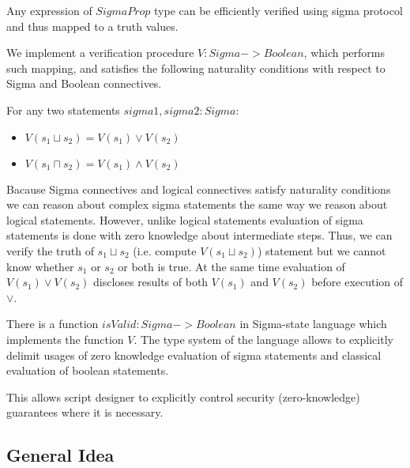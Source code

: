 \documentclass[11pt]{article}
\begin{document}
Any expression of $SigmaProp$ type can be efficiently verified using sigma protocol and thus mapped to a truth values.

We implement a verification procedure $V: Sigma -> Boolean$, which performs such mapping, and satisfies the following
naturality conditions with respect to Sigma and Boolean connectives.

For any two statements $sigma1, sigma2: Sigma$:
\begin{itemize}
    \item $V(s_1 \sqcup s_2) = V(s_1) \lor V(s_2)$
    \item $V(s_1 \sqcap s_2) = V(s_1) \land V(s_2)$
\end{itemize}

Bacause Sigma connectives and logical connectives satisfy naturality conditions we can reason about complex sigma statements
the same way we reason about logical statements.
However, unlike logical statements evaluation of sigma statements is done with zero knowledge about intermediate steps.
Thus, we can verify the truth of $s_1 \sqcup s_2$ (i.e. compute $V(s_1 \sqcup s_2)$) statement but we cannot know whether $s_1$ or $s_2$ or both is true. At the same time evaluation of $V(s_1) \lor V(s_2)$ discloses results of both $V(s_1)$ and $V(s_2)$ before execution of $\lor$.

There is a function $isValid: Sigma -> Boolean$ in Sigma-state language which implements the function $V$.
The type system of the language allows to explicitly delimit usages of zero knowledge evaluation
of sigma statements and classical evaluation of boolean statements.

This allows script designer to explicitly control security (zero-knowledge) guarantees where it is necessary.

\subsection{General Idea}
\end{document}
